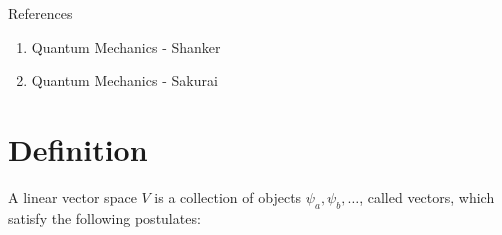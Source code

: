 
References
\begin{enumerate}
	\item 
	Quantum Mechanics	-	Shanker
	
	\item
	Quantum Mechanics	- Sakurai
\end{enumerate}

\section{Definition}
A linear vector space $V$ is a collection of objects $\psi_a, \psi_b, \ldots$, called vectors, which satisfy the following postulates:
